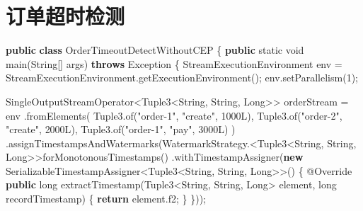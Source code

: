 \documentclass[cn,11pt,chinese]{elegantbook}
\newenvironment{Shaded}{}{}
\newcommand{\AttributeTok}[1]{\textcolor[rgb]{0.49,0.56,0.16}{#1}}
\newcommand{\BuiltInTok}[1]{#1}
\newcommand{\DataTypeTok}[1]{\textcolor[rgb]{0.56,0.13,0.00}{#1}}
\newcommand{\DecValTok}[1]{\textcolor[rgb]{0.25,0.63,0.44}{#1}}
\newcommand{\FunctionTok}[1]{\textcolor[rgb]{0.02,0.16,0.49}{#1}}
\newcommand{\KeywordTok}[1]{\textcolor[rgb]{0.00,0.44,0.13}{\textbf{#1}}}
\newcommand{\NormalTok}[1]{#1}
\newcommand{\StringTok}[1]{\textcolor[rgb]{0.25,0.44,0.63}{#1}}
\begin{document}
\hypertarget{ux8ba2ux5355ux8d85ux65f6ux68c0ux6d4b}{%
\section{订单超时检测}\label{ux8ba2ux5355ux8d85ux65f6ux68c0ux6d4b}}

\begin{Shaded}
\begin{Highlighting}[]
\KeywordTok{public} \KeywordTok{class}\NormalTok{ OrderTimeoutDetectWithoutCEP \{}
    \KeywordTok{public} \DataTypeTok{static} \DataTypeTok{void} \FunctionTok{main}\NormalTok{(}\BuiltInTok{String}\NormalTok{[] args) }\KeywordTok{throws} \BuiltInTok{Exception}\NormalTok{ \{}
\NormalTok{        StreamExecutionEnvironment env = StreamExecutionEnvironment.}\FunctionTok{getExecutionEnvironment}\NormalTok{();}
\NormalTok{        env.}\FunctionTok{setParallelism}\NormalTok{(}\DecValTok{1}\NormalTok{);}

\NormalTok{        SingleOutputStreamOperator\textless{}Tuple3\textless{}}\BuiltInTok{String}\NormalTok{, }\BuiltInTok{String}\NormalTok{, }\BuiltInTok{Long}\NormalTok{\textgreater{}\textgreater{} orderStream = env}
\NormalTok{            .}\FunctionTok{fromElements}\NormalTok{(}
\NormalTok{                Tuple3.}\FunctionTok{of}\NormalTok{(}\StringTok{"order{-}1"}\NormalTok{, }\StringTok{"create"}\NormalTok{, }\DecValTok{1000L}\NormalTok{),}
\NormalTok{                Tuple3.}\FunctionTok{of}\NormalTok{(}\StringTok{"order{-}2"}\NormalTok{, }\StringTok{"create"}\NormalTok{, }\DecValTok{2000L}\NormalTok{),}
\NormalTok{                Tuple3.}\FunctionTok{of}\NormalTok{(}\StringTok{"order{-}1"}\NormalTok{, }\StringTok{"pay"}\NormalTok{, }\DecValTok{3000L}\NormalTok{)}
\NormalTok{            )}
\NormalTok{            .}\FunctionTok{assignTimestampsAndWatermarks}\NormalTok{(WatermarkStrategy.\textless{}Tuple3\textless{}}\BuiltInTok{String}\NormalTok{, }\BuiltInTok{String}\NormalTok{, }\BuiltInTok{Long}\NormalTok{\textgreater{}\textgreater{}}\FunctionTok{forMonotonousTimestamps}\NormalTok{()}
\NormalTok{                .}\FunctionTok{withTimestampAssigner}\NormalTok{(}\KeywordTok{new}\NormalTok{ SerializableTimestampAssigner\textless{}Tuple3\textless{}}\BuiltInTok{String}\NormalTok{, }\BuiltInTok{String}\NormalTok{, }\BuiltInTok{Long}\NormalTok{\textgreater{}\textgreater{}() \{}
                    \AttributeTok{@Override}
                    \KeywordTok{public} \DataTypeTok{long} \FunctionTok{extractTimestamp}\NormalTok{(Tuple3\textless{}}\BuiltInTok{String}\NormalTok{, }\BuiltInTok{String}\NormalTok{, }\BuiltInTok{Long}\NormalTok{\textgreater{} element, }\DataTypeTok{long}\NormalTok{ recordTimestamp) \{}
                        \KeywordTok{return}\NormalTok{ element.}\FunctionTok{f2}\NormalTok{;}
\NormalTok{                    \}}
\NormalTok{                \}));}


\end{Highlighting}
\end{Shaded}
\end{document}
